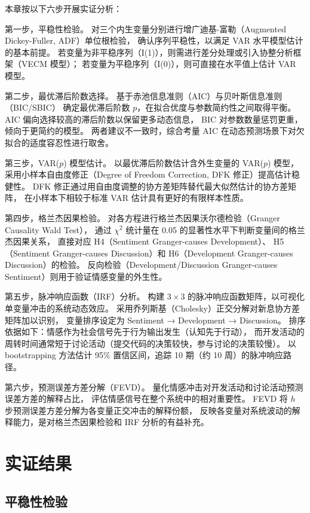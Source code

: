 本章按以下六步开展实证分析：

第一步，平稳性检验。
对三个内生变量分别进行增广迪基-富勒（Augmented Dickey-Fuller, ADF）单位根检验，
确认序列平稳性，以满足 VAR 水平模型估计的基本前提。
若变量为非平稳序列（I(1)），则需进行差分处理或引入协整分析框架（VECM 模型）；
若变量为平稳序列（I(0)），则可直接在水平值上估计 VAR 模型。

第二步，最优滞后阶数选择。
基于赤池信息准则（AIC）与贝叶斯信息准则（BIC/SBIC）
确定最优滞后阶数 $p$，在拟合优度与参数简约性之间取得平衡。
AIC 偏向选择较高的滞后阶数以保留更多动态信息，
BIC 对参数数量惩罚更重，倾向于更简约的模型。
两者建议不一致时，综合考量 AIC 在动态预测场景下对欠拟合的适度容忍性进行取舍。

第三步，VAR($p$) 模型估计。
以最优滞后阶数估计含外生变量的 VAR($p$) 模型，
采用小样本自由度修正（Degree of Freedom Correction, DFK 修正）提高估计稳健性。
DFK 修正通过用自由度调整的协方差矩阵替代最大似然估计的协方差矩阵，
在小样本下相较于标准 VAR 估计具有更好的有限样本性质。

第四步，格兰杰因果检验。
对各方程进行格兰杰因果沃尔德检验（Granger Causality Wald Test），
通过 $\chi^2$ 统计量在 0.05 的显著性水平下判断变量间的格兰杰因果关系，
直接对应 H4（Sentiment Granger-causes Development）、
H5（Sentiment Granger-causes Discussion）和 H6（Development Granger-causes Discussion）的检验。
反向检验（Development/Discussion Granger-causes Sentiment）则用于验证情感变量的外生性。

第五步，脉冲响应函数（IRF）分析。
构建 $3 \times 3$ 的脉冲响应函数矩阵，以可视化单变量冲击的系统动态效应。
采用乔列斯基（Cholesky）正交分解对新息协方差矩阵加以识别，
变量排序设定为 Sentiment → Development → Discussion。
排序依据如下：情感作为社会信号先于行为输出发生（认知先于行动），
而开发活动的周转时间通常短于讨论活动（提交代码的决策较快，参与讨论的决策较慢）。
以 bootstrapping 方法估计 95\% 置信区间，追踪 10 期（约 10 周）的脉冲响应路径。

第六步，预测误差方差分解（FEVD）。
量化情感冲击对开发活动和讨论活动预测误差方差的解释占比，
评估情感信号在整个系统中的相对重要性。
FEVD 将 $h$ 步预测误差方差分解为各变量正交冲击的解释份额，
反映各变量对系统波动的解释能力，是对格兰杰因果检验和 IRF 分析的有益补充。


\section{实证结果}

\subsection{平稳性检验}

